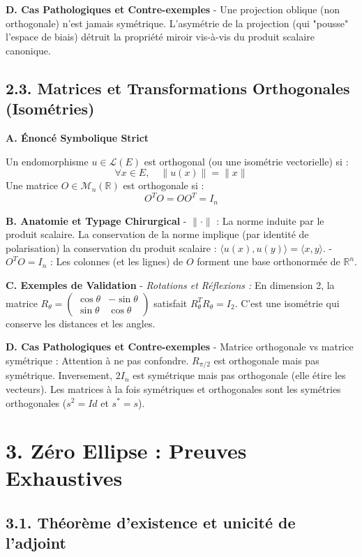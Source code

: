 \documentclass[11pt,a4paper]{article}
\begin{document}
\textbf{D. Cas Pathologiques et Contre-exemples}
- Une projection oblique (non orthogonale) n'est jamais symétrique. L'asymétrie de la projection (qui "pousse" l'espace de biais) détruit la propriété miroir vis-à-vis du produit scalaire canonique.

\subsection{2.3. Matrices et Transformations Orthogonales (Isométries)}

\textbf{A. Énoncé Symbolique Strict}

Un endomorphisme $u \in \mathcal{L}(E)$ est orthogonal (ou une isométrie vectorielle) si :
$$ \forall x \in E, \quad \|u(x)\| = \|x\| $$
Une matrice $O \in \mathcal{M}_n(\mathbb{R})$ est orthogonale si :
$$ O^T O = O O^T = I_n $$

\textbf{B. Anatomie et Typage Chirurgical}
- $\| \cdot \|$ : La norme induite par le produit scalaire. La conservation de la norme implique (par identité de polarisation) la conservation du produit scalaire : $\langle u(x), u(y) \rangle = \langle x, y \rangle$.
- $O^T O = I_n$ : Les colonnes (et les lignes) de $O$ forment une base orthonormée de $\mathbb{R}^n$.

\textbf{C. Exemples de Validation}
- \textit{Rotations et Réflexions :} En dimension 2, la matrice $R_\theta = \begin{pmatrix} \cos\theta & -\sin\theta \\ \sin\theta & \cos\theta \end{pmatrix}$ satisfait $R_\theta^T R_\theta = I_2$. C'est une isométrie qui conserve les distances et les angles.

\textbf{D. Cas Pathologiques et Contre-exemples}
- Matrice orthogonale vs matrice symétrique : Attention à ne pas confondre. $R_{\pi/2}$ est orthogonale mais pas symétrique. Inversement, $2I_n$ est symétrique mais pas orthogonale (elle étire les vecteurs). Les matrices à la fois symétriques et orthogonales sont les symétries orthogonales ($s^2 = Id$ et $s^* = s$).

\section{3. Zéro Ellipse : Preuves Exhaustives}

\subsection{3.1. Théorème d'existence et unicité de l'adjoint}
\end{document}
